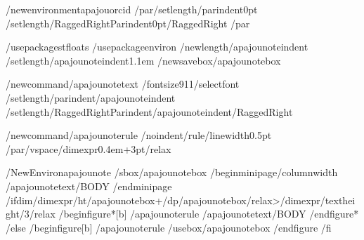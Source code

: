 /newenvironment{apajouorcid}
  {/par/setlength{/parindent}{0pt}%
   /setlength{/RaggedRightParindent}{0pt}/RaggedRight}
  {/par}

%
%
%
%
/usepackage{stfloats}
/usepackage{environ}
/newlength{/apajounoteindent}
/setlength{/apajounoteindent}{1.1em}
/newsavebox{/apajounotebox}

/newcommand{/apajounotetext}{%
  /fontsize{9}{11}/selectfont
  /setlength{/parindent}{/apajounoteindent}%
  /setlength{/RaggedRightParindent}{/apajounoteindent}/RaggedRight}

/newcommand{/apajounoterule}{%
  /noindent/rule{/linewidth}{0.5pt}%
  /par/vspace{/dimexpr0.4em+3pt/relax}}

/NewEnviron{apajounote}{%
  /sbox{/apajounotebox}{%
    /begin{minipage}{/columnwidth}%
      /apajounotetext/BODY
    /end{minipage}}%
  /ifdim/dimexpr/ht/apajounotebox+/dp/apajounotebox/relax>/dimexpr/textheight/3/relax
    /begin{figure*}[b]%
      /apajounoterule
      /apajounotetext/BODY
    /end{figure*}%
  /else
    /begin{figure}[b]%
      /apajounoterule
      /usebox{/apajounotebox}%
    /end{figure}%
  /fi}

